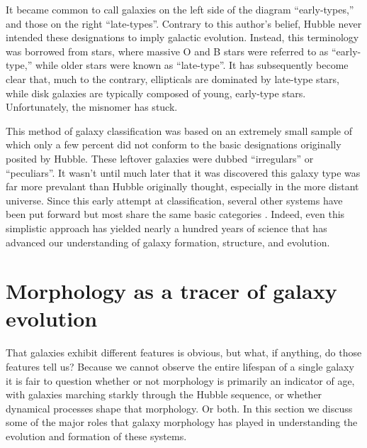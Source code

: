 It became common to call galaxies on the left side of the diagram ``early-types,'' and those on the right ``late-types''. Contrary to this author's belief, Hubble never intended these designations to imply galactic evolution. Instead, this terminology was borrowed from stars, where massive O and B stars were referred to as ``early-type,'' while older stars were known as ``late-type''\citep{Buta2011}. It has subsequently become clear that, much to the contrary, ellipticals are dominated by late-type stars, while disk galaxies are typically composed of young, early-type stars.  Unfortunately, the misnomer has stuck. 


This method of galaxy classification was based on an extremely small sample of which only a few percent did not conform to the basic designations originally posited by Hubble. These leftover galaxies were dubbed ``irregulars'' or ``peculiars''. It wasn't until much later that it was discovered this galaxy type was far more prevalant than Hubble originally thought, especially in the more distant universe. Since this early attempt at classification, several other systems have been put forward but most share the same basic categories \citep[e.g.,][]{deVaucouleurs1959, Conselice2006}. Indeed, even this simplistic approach has yielded nearly a hundred years of science that has advanced our understanding of galaxy formation, structure, and evolution. 
 

\section{Morphology as a tracer of galaxy evolution}

That galaxies exhibit different features is obvious, but what, if anything, do those features tell us? Because we cannot observe the entire lifespan of a single galaxy it is fair to question whether or not morphology is primarily an indicator of age, with galaxies marching starkly through the Hubble sequence, or whether dynamical processes shape that morphology. Or both. In this section we discuss some of the major roles that galaxy morphology has played in understanding the evolution and formation of these systems. 



